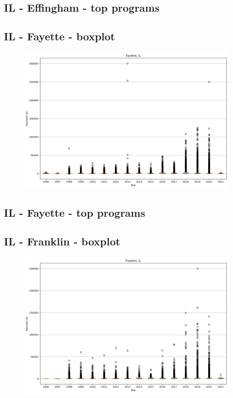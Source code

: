 \subsection*{IL - Effingham - top programs}

\newpage
\subsection*{IL - Fayette - boxplot}
\begin{figure}[h]
\centering
\includegraphics[width=7in]{../output/boxplots/counties/Fayette-IL_boxplot.png}
\end{figure}


\subsection*{IL - Fayette - top programs}

\newpage
\subsection*{IL - Franklin - boxplot}
\begin{figure}[h]
\centering
\includegraphics[width=7in]{../output/boxplots/counties/Franklin-IL_boxplot.png}
\end{figure}



